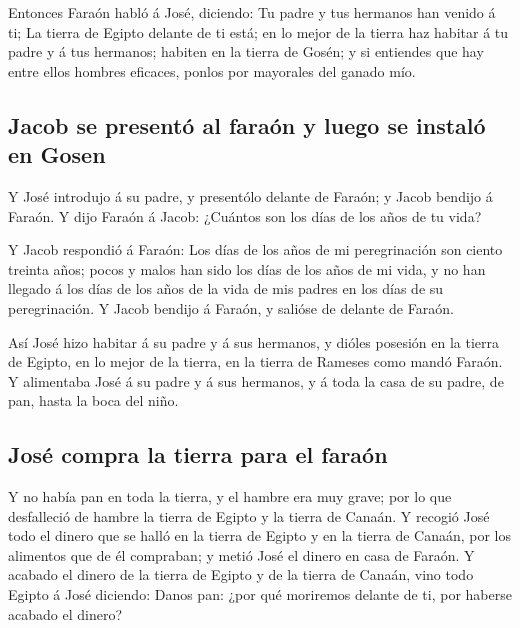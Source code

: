 Entonces Faraón habló á José, diciendo: Tu padre y tus
hermanos han venido á ti;  La tierra de Egipto delante de
ti está; en lo mejor de la tierra haz habitar á tu padre y á tus
hermanos; habiten en la tierra de Gosén; y si entiendes que hay entre
ellos hombres eficaces, ponlos por mayorales del ganado mío.

\hypertarget{jacob-se-presentuxf3-al-farauxf3n-y-luego-se-instaluxf3-en-gosen}{%
\subsection{Jacob se presentó al faraón y luego se instaló en
Gosen}\label{jacob-se-presentuxf3-al-farauxf3n-y-luego-se-instaluxf3-en-gosen}}

 Y José introdujo á su padre, y presentólo delante de
Faraón; y Jacob bendijo á Faraón.  Y dijo Faraón á Jacob:
¿Cuántos son los días de los años de tu vida?

 Y Jacob respondió á Faraón: Los días de los años de mi
peregrinación son ciento treinta años; pocos y malos han sido los días
de los años de mi vida, y no han llegado á los días de los años de la
vida de mis padres en los días de su peregrinación.  Y
Jacob bendijo á Faraón, y salióse de delante de Faraón.

 Así José hizo habitar á su padre y á sus hermanos, y
dióles posesión en la tierra de Egipto, en lo mejor de la tierra, en la
tierra de Rameses como mandó Faraón.  Y alimentaba José á
su padre y á sus hermanos, y á toda la casa de su padre, de pan, hasta
la boca del niño.

\hypertarget{josuxe9-compra-la-tierra-para-el-farauxf3n}{%
\subsection{José compra la tierra para el
faraón}\label{josuxe9-compra-la-tierra-para-el-farauxf3n}}

 Y no había pan en toda la tierra, y el hambre era muy
grave; por lo que desfalleció de hambre la tierra de Egipto y la tierra
de Canaán.  Y recogió José todo el dinero que se halló en
la tierra de Egipto y en la tierra de Canaán, por los alimentos que de
él compraban; y metió José el dinero en casa de Faraón. 
Y acabado el dinero de la tierra de Egipto y de la tierra de Canaán,
vino todo Egipto á José diciendo: Danos pan: ¿por qué moriremos delante
de ti, por haberse acabado el dinero?

